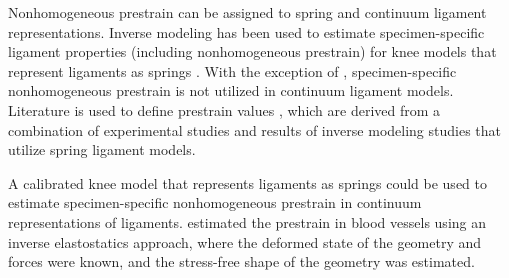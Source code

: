 Nonhomogeneous prestrain can be assigned to spring and continuum ligament representations. Inverse modeling has been used to estimate specimen-specific ligament properties (including nonhomogeneous prestrain) for knee models that represent ligaments as springs \citep{blankevoort_validation_1996,baldwin_efficient_2009,ewing_estimating_2015,harris_combined_2016}. With the exception of \cite{gardiner_subject-specific_2003}, specimen-specific nonhomogeneous prestrain is not utilized in continuum ligament models. Literature is used to define prestrain values \citep{pena_three-dimensional_2006,dhaher_effect_2010}, which are derived from a combination of experimental studies and results of inverse modeling studies that utilize spring ligament models.

A calibrated knee model that represents ligaments as springs could be used to estimate specimen-specific nonhomogeneous prestrain in continuum representations of ligaments. \cite{lu_computational_2007} estimated the prestrain in blood vessels using an inverse elastostatics approach, where the deformed state of the geometry and forces were known, and the stress-free shape of the geometry was estimated. 


